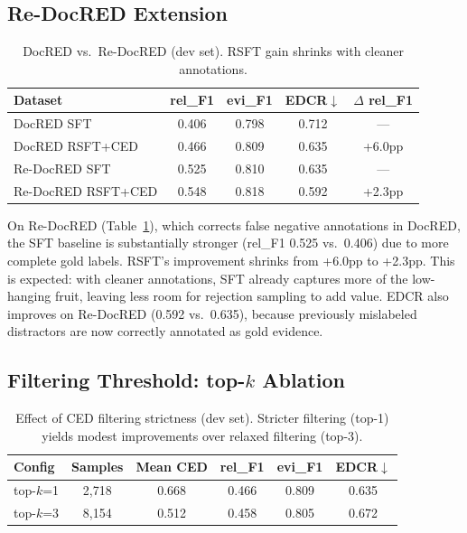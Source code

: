 \documentclass[11pt,a4paper]{article}
\begin{document}
\subsection{Re-DocRED Extension}

\begin{table}[t]
\centering
\caption{DocRED vs.\ Re-DocRED (dev set). RSFT gain shrinks with cleaner annotations.}
\label{tab:redocred}
\small
\begin{tabular}{lcccc}
\toprule
\textbf{Dataset} & \textbf{rel\_F1} & \textbf{evi\_F1} & \textbf{EDCR}$\downarrow$ & \textbf{$\Delta$ rel\_F1} \\
\midrule
DocRED SFT            & 0.406 & 0.798 & 0.712 & --- \\
DocRED RSFT+CED       & 0.466 & 0.809 & 0.635 & +6.0pp \\
\midrule
Re-DocRED SFT         & 0.525 & 0.810 & 0.635 & --- \\
Re-DocRED RSFT+CED    & 0.548 & 0.818 & 0.592 & +2.3pp \\
\bottomrule
\end{tabular}
\end{table}

On Re-DocRED (Table~\ref{tab:redocred}), which corrects false negative annotations in DocRED, the SFT baseline is substantially stronger (rel\_F1 0.525 vs.\ 0.406) due to more complete gold labels.
RSFT's improvement shrinks from +6.0pp to +2.3pp.
This is expected: with cleaner annotations, SFT already captures more of the low-hanging fruit, leaving less room for rejection sampling to add value.
EDCR also improves on Re-DocRED (0.592 vs.\ 0.635), because previously mislabeled distractors are now correctly annotated as gold evidence.

\subsection{Filtering Threshold: top-$k$ Ablation}

\begin{table}[t]
\centering
\caption{Effect of CED filtering strictness (dev set). Stricter filtering (top-1) yields modest improvements over relaxed filtering (top-3).}
\label{tab:topk}
\small
\begin{tabular}{lccccc}
\toprule
\textbf{Config} & \textbf{Samples} & \textbf{Mean CED} & \textbf{rel\_F1} & \textbf{evi\_F1} & \textbf{EDCR}$\downarrow$ \\
\midrule
top-$k$=1 & 2,718  & 0.668 & 0.466 & 0.809 & 0.635 \\
top-$k$=3 & 8,154  & 0.512 & 0.458 & 0.805 & 0.672 \\
\bottomrule
\end{tabular}
\end{table}
\end{document}
